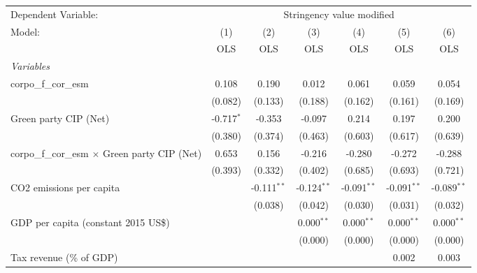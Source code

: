 
\begingroup
\centering
\begin{tabular}{lcccccc}
   \toprule
   Dependent Variable: & \multicolumn{6}{c}{Stringency value modified}\\
   Model:                                                & (1)          & (2)           & (3)           & (4)           & (5)           & (6)\\  
                                                         &  OLS         & OLS           & OLS           & OLS           & OLS           & OLS\\  
   \midrule
   \emph{Variables}\\
   corpo\_f\_cor\_esm                                    & 0.108        & 0.190         & 0.012         & 0.061         & 0.059         & 0.054\\   
                                                         & (0.082)      & (0.133)       & (0.188)       & (0.162)       & (0.161)       & (0.169)\\   
   Green party CIP (Net)                                 & -0.717$^{*}$ & -0.353        & -0.097        & 0.214         & 0.197         & 0.200\\   
                                                         & (0.380)      & (0.374)       & (0.463)       & (0.603)       & (0.617)       & (0.639)\\   
   corpo\_f\_cor\_esm $\times$ Green party CIP (Net)     & 0.653        & 0.156         & -0.216        & -0.280        & -0.272        & -0.288\\   
                                                         & (0.393)      & (0.332)       & (0.402)       & (0.685)       & (0.693)       & (0.721)\\   
   CO2 emissions per capita                              &              & -0.111$^{**}$ & -0.124$^{**}$ & -0.091$^{**}$ & -0.091$^{**}$ & -0.089$^{**}$\\   
                                                         &              & (0.038)       & (0.042)       & (0.030)       & (0.031)       & (0.032)\\   
   GDP per capita (constant 2015 US\$)                   &              &               & 0.000$^{**}$  & 0.000$^{**}$  & 0.000$^{**}$  & 0.000$^{**}$\\   
                                                         &              &               & (0.000)       & (0.000)       & (0.000)       & (0.000)\\   
   Tax revenue (\% of GDP)                               &              &               &               &               & 0.002         & 0.003\\   

\end{tabular}
